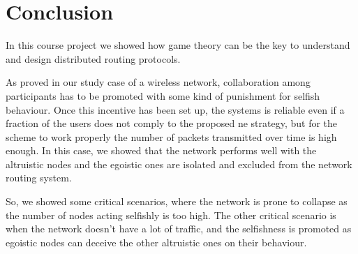 \documentclass[conference,10.5pt]{IEEEtran}
\begin{document}
\section{Conclusion}

In this course project we showed how game theory can be the key to understand and design distributed routing protocols.

As proved in our study case of a wireless network, collaboration among participants has to be promoted with some kind of punishment for selfish behaviour.
Once this incentive has been set up, the systems is reliable even if a fraction of the users does not comply to the proposed \gls{ne} strategy, but for the scheme to work properly the number of packets transmitted over time is high enough. In this case, we showed that the network performs well with the altruistic nodes and the egoistic ones are isolated and excluded from the network routing system.

So, we showed some critical scenarios, where the network is prone to collapse as the number of nodes acting selfishly is too high. The other critical scenario is when the network doesn't have a lot of traffic, and the selfishness is promoted as egoistic nodes can deceive the other altruistic ones on their behaviour.


\nocite{*}


\end{document}
